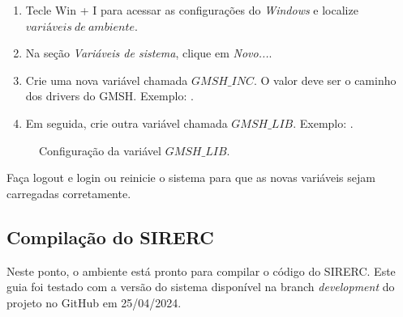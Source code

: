 \documentclass[a4paper,11pt]{article}
\newcommand{\sistema}{\textsf{SIRERC}}
\newcommand{\windows}{\textit{Windows}}
\begin{document}
	\begin{enumerate}
		\item Tecle Win + I para acessar as configurações do \windows{} e localize $variáveis\ de\ ambiente$.
		\item Na seção \textit{Variáveis de sistema}, clique em \textit{Novo...}.
		\item Crie uma nova variável chamada $GMSH\_INC$. O valor deve ser o caminho dos drivers do GMSH. Exemplo: .
		\item Em seguida, crie outra variável chamada $GMSH\_LIB$. Exemplo: .
	\end{enumerate}
	
\begin{figure}[H]
	\centering
	\caption{Configuração da variável $GMSH\_LIB$.}
	\label{fig:gmsh_lib}
\end{figure}
	
Faça logout e login ou reinicie o sistema para que as novas variáveis sejam carregadas corretamente.

\subsection{Compilação do \sistema{}}

Neste ponto, o ambiente está pronto para compilar o código do \sistema{}. Este guia foi testado com a versão do sistema disponível na branch \emph{development} do projeto no GitHub em 25/04/2024.
\end{document}
